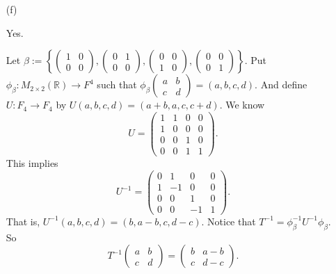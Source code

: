 \begin{Exercise}
\begin{enumerate}[(a)]
		\item[(f)]
		\begin{answer}
			Yes.
		\end{answer}
		\begin{solution}
			Let $\beta := \left\{\begin{pmatrix}
			1 & 0 \\
			0 & 0 
			\end{pmatrix}, \begin{pmatrix}
			0 & 1 \\
			0 & 0
			\end{pmatrix}, \begin{pmatrix}
			0 & 0 \\
			1 & 0
			\end{pmatrix}, \begin{pmatrix}
			0 & 0 \\
			0 & 1
			\end{pmatrix} \right\}$. Put $\phi_{\beta}:M_{2\times 2}(\mathbb{R}) \to F^4$ such that $\phi_{\beta}\begin{pmatrix}
			a & b \\
			c & d
			\end{pmatrix} = (a,b,c,d)$. And define $U:F_4\to F_4$ by $U(a,b,c,d) = (a+b,a,c,c+d)$. We know
			$$
			U = \begin{pmatrix}
			1 & 1 & 0 & 0 \\
			1 & 0 & 0 & 0 \\
			0 & 0 & 1 & 0 \\
			0 & 0 & 1 & 1
			\end{pmatrix}.
			$$
			This implies
			$$
			U^{-1} = \begin{pmatrix}
			0 & 1 & 0 & 0 \\
			1 & -1 & 0 & 0 \\
			0 & 0 & 1 & 0 \\
			0 & 0 & -1 & 1
			\end{pmatrix}.
			$$
			That is, $U^{-1}(a,b,c,d) = (b,a-b,c,d-c)$. Notice that $T^{-1} = \phi_{\beta}^{-1} U^{-1} \phi_{\beta}$. So
			$$
			T^{-1}\begin{pmatrix}
			a & b \\
			c & d
			\end{pmatrix} = \begin{pmatrix}
			b & a-b \\
			c & d-c
			\end{pmatrix}.
			$$
		\end{solution}
		
	\end{enumerate}
\end{Exercise}